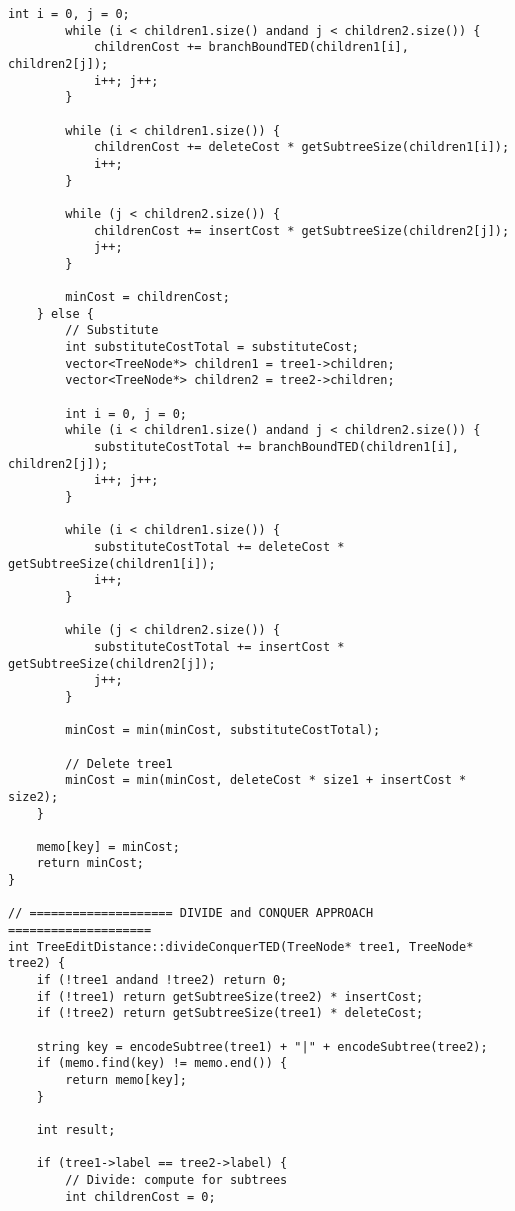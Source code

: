 \documentclass[12pt]{article}
\begin{document}
\begin{lstlisting}[caption=Complete Tree Edit Distance Implementation]
        int i = 0, j = 0;
        while (i < children1.size() andand j < children2.size()) {
            childrenCost += branchBoundTED(children1[i], children2[j]);
            i++; j++;
        }
        
        while (i < children1.size()) {
            childrenCost += deleteCost * getSubtreeSize(children1[i]);
            i++;
        }
        
        while (j < children2.size()) {
            childrenCost += insertCost * getSubtreeSize(children2[j]);
            j++;
        }
        
        minCost = childrenCost;
    } else {
        // Substitute
        int substituteCostTotal = substituteCost;
        vector<TreeNode*> children1 = tree1->children;
        vector<TreeNode*> children2 = tree2->children;
        
        int i = 0, j = 0;
        while (i < children1.size() andand j < children2.size()) {
            substituteCostTotal += branchBoundTED(children1[i], children2[j]);
            i++; j++;
        }
        
        while (i < children1.size()) {
            substituteCostTotal += deleteCost * getSubtreeSize(children1[i]);
            i++;
        }
        
        while (j < children2.size()) {
            substituteCostTotal += insertCost * getSubtreeSize(children2[j]);
            j++;
        }
        
        minCost = min(minCost, substituteCostTotal);
        
        // Delete tree1
        minCost = min(minCost, deleteCost * size1 + insertCost * size2);
    }
    
    memo[key] = minCost;
    return minCost;
}

// ==================== DIVIDE and CONQUER APPROACH ====================
int TreeEditDistance::divideConquerTED(TreeNode* tree1, TreeNode* tree2) {
    if (!tree1 andand !tree2) return 0;
    if (!tree1) return getSubtreeSize(tree2) * insertCost;
    if (!tree2) return getSubtreeSize(tree1) * deleteCost;
    
    string key = encodeSubtree(tree1) + "|" + encodeSubtree(tree2);
    if (memo.find(key) != memo.end()) {
        return memo[key];
    }
    
    int result;
    
    if (tree1->label == tree2->label) {
        // Divide: compute for subtrees
        int childrenCost = 0;
        

\end{lstlisting}
\end{document}
